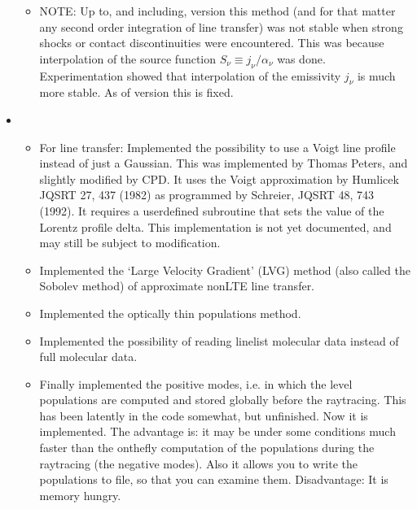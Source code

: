 \documentclass[letterpaper,10pt,english]{sphinxmanual}
\begin{document}
\begin{itemize}
\begin{itemize}
\item {} 
NOTE: Up to, and including, version  this
method (and for that matter any second order integration of line
transfer) was not stable when strong shocks or contact discontinuities
were encountered. This was because interpolation of the source function
\(S_\nu\equiv j_\nu/\alpha_\nu\) was done. Experimentation showed that
interpolation of the emissivity \(j_\nu\) is much more stable. As of
version  this is fixed.

\end{itemize}

\item {} 
\begin{itemize}
\item {} 
For line transfer: Implemented the possibility to use a Voigt line
profile instead of just a Gaussian. This was implemented by Thomas
Peters, and slightly modified by CPD. It uses the Voigt approximation by
Humlicek JQSRT 27, 437 (1982) as programmed by Schreier, JQSRT 48, 743
(1992). It requires a user\sphinxhyphen{}defined subroutine 
that sets the value of the Lorentz
profile delta. This implementation is not yet documented, and may still
be subject to modification.

\item {} 
Implemented the ‘Large Velocity Gradient’ (LVG) method (also
called the Sobolev method) of approximate non\sphinxhyphen{}LTE line transfer.

\item {} 
Implemented the optically thin populations method.

\item {} 
Implemented the possibility of reading linelist molecular data
instead of full molecular data. 

\item {} 
Finally implemented the positive  modes,
i.e. in which the level populations are computed and stored globally
before the ray\sphinxhyphen{}tracing. This has been latently in the code somewhat, but
unfinished. Now it is implemented. The advantage is: it may be under
some conditions much faster than the on\sphinxhyphen{}the\sphinxhyphen{}fly computation of the
populations during the ray\sphinxhyphen{}tracing (the negative 
modes). Also it allows you to write the populations to file, so that you
can examine them. Disadvantage: It is memory hungry.


\end{itemize}
\end{itemize}
\end{document}
